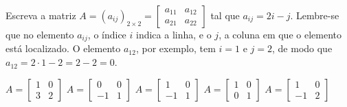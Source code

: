 Escreva a matriz $A=(a_{ij})_{2\times 2}=\left[ \begin{array}{cc}
a_{11} & a_{12} \\
a_{21} & a_{22}
\end{array} \right]$ tal que $a_{ij}=2i-j$. Lembre-se que no elemento $a_{ij}$, o índice $i$ indica a linha, e o $j$, a coluna em que o elemento está localizado. O elemento $a_{12}$, por exemplo, tem $i=1$ e $j=2$, de modo que $a_{12}=2\cdot 1-2=2-2=0$.

$A = \left[ \begin{array}{cc} 1 & 0 \\3 & 2 \end{array} \right]$
$A = \left[ \begin{array}{cc} 0 & 0 \\-1 & 1 \end{array} \right]$
$A = \left[ \begin{array}{cc} 1 & 0 \\-1 & 1 \end{array} \right]$
$A = \left[ \begin{array}{cc} 1 & 0 \\0 & 1 \end{array} \right]$
$A = \left[ \begin{array}{cc} 1 & 0 \\-1 & 2 \end{array} \right]$



